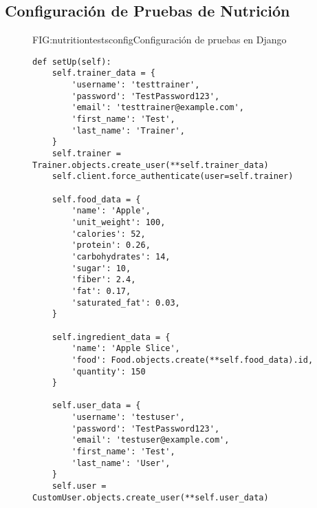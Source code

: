 \subsection{Configuración de Pruebas de Nutrición}
\begin{figure}[Configuración de Pruebas]{FIG:nutritiontestsconfig}{Configuración de pruebas en Django}
    \begin{verbatim}
def setUp(self):
    self.trainer_data = {
        'username': 'testtrainer',
        'password': 'TestPassword123',
        'email': 'testtrainer@example.com',
        'first_name': 'Test',
        'last_name': 'Trainer',
    }
    self.trainer = Trainer.objects.create_user(**self.trainer_data)
    self.client.force_authenticate(user=self.trainer)

    self.food_data = {
        'name': 'Apple',
        'unit_weight': 100,
        'calories': 52,
        'protein': 0.26,
        'carbohydrates': 14,
        'sugar': 10,
        'fiber': 2.4,
        'fat': 0.17,
        'saturated_fat': 0.03,
    }

    self.ingredient_data = {
        'name': 'Apple Slice',
        'food': Food.objects.create(**self.food_data).id,
        'quantity': 150
    }

    self.user_data = {
        'username': 'testuser',
        'password': 'TestPassword123',
        'email': 'testuser@example.com',
        'first_name': 'Test',
        'last_name': 'User',
    }
    self.user = CustomUser.objects.create_user(**self.user_data)
    \end{verbatim}
    \end{figure}

\newpage
